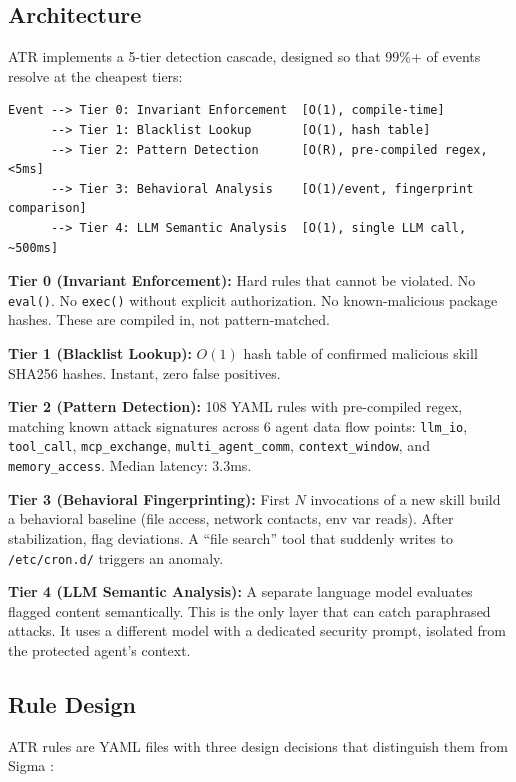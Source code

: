\documentclass[11pt,letterpaper]{article}
\begin{document}
\subsection{Architecture}

ATR implements a 5-tier detection cascade, designed so that 99\%+ of events resolve at the cheapest tiers:

\begin{lstlisting}
Event --> Tier 0: Invariant Enforcement  [O(1), compile-time]
      --> Tier 1: Blacklist Lookup       [O(1), hash table]
      --> Tier 2: Pattern Detection      [O(R), pre-compiled regex, <5ms]
      --> Tier 3: Behavioral Analysis    [O(1)/event, fingerprint comparison]
      --> Tier 4: LLM Semantic Analysis  [O(1), single LLM call, ~500ms]
\end{lstlisting}

\textbf{Tier 0 (Invariant Enforcement):} Hard rules that cannot be violated. No \texttt{eval()}. No \texttt{exec()} without explicit authorization. No known-malicious package hashes. These are compiled in, not pattern-matched.

\textbf{Tier 1 (Blacklist Lookup):} $O(1)$ hash table of confirmed malicious skill SHA256 hashes. Instant, zero false positives.

\textbf{Tier 2 (Pattern Detection):} 108 YAML rules with pre-compiled regex, matching known attack signatures across 6 agent data flow points: \texttt{llm\_io}, \texttt{tool\_call}, \texttt{mcp\_exchange}, \texttt{multi\_agent\_comm}, \texttt{context\_window}, and \texttt{memory\_access}. Median latency: 3.3ms.

\textbf{Tier 3 (Behavioral Fingerprinting):} First $N$ invocations of a new skill build a behavioral baseline (file access, network contacts, env var reads). After stabilization, flag deviations. A ``file search'' tool that suddenly writes to \texttt{/etc/cron.d/} triggers an anomaly.

\textbf{Tier 4 (LLM Semantic Analysis):} A separate language model evaluates flagged content semantically. This is the only layer that can catch paraphrased attacks. It uses a different model with a dedicated security prompt, isolated from the protected agent's context.

\subsection{Rule Design}

ATR rules are YAML files with three design decisions that distinguish them from Sigma \cite{sigma}:
\end{document}
